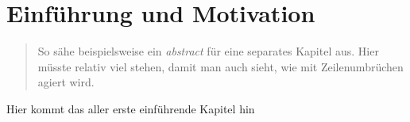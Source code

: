 


\chapter{Einführung und Motivation}

\begin{quote}
    So sähe beispielsweise ein \textit{abstract} für eine separates Kapitel aus. Hier müsste relativ viel stehen, damit man
    auch sieht, wie mit Zeilenumbrüchen agiert wird.
\end{quote}
Hier kommt das aller erste einführende Kapitel hin

